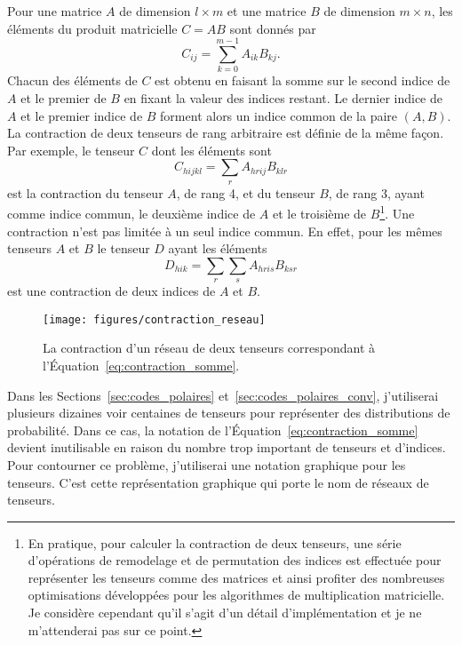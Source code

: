 Pour une matrice $A$ de dimension $l \times m$ et une matrice $B$ de dimension $m \times n$,
les éléments du produit matricielle $C = AB$ sont donnés par
\begin{equation}
  C_{ij} = \sum_{k=0}^{m - 1} A_{ik} B_{kj}.
\end{equation}
Chacun des éléments de $C$ est obtenu en faisant 
la somme sur le second indice de $A$ et le premier de $B$ 
en fixant la valeur des indices restant.
Le dernier indice de $A$ et le premier indice de $B$ forment 
alors un indice common de la paire $(A, B)$.
La contraction de deux tenseurs de rang arbitraire est définie 
de la même façon.
Par exemple, 
le tenseur $C$ dont les éléments sont
\begin{equation}
  C_{hijkl} = \sum_{r} A_{hrij} B_{klr}
\end{equation}
est la contraction du tenseur $A$, de rang 4,
et du tenseur $B$, de rang 3, 
ayant comme indice commun,
le deuxième indice de $A$ et le troisième de $B$\footnote{
En pratique, pour calculer la contraction de deux tenseurs, 
une série d'opérations de remodelage et de permutation des indices 
est effectuée pour représenter les tenseurs comme des matrices et 
ainsi profiter des nombreuses optimisations développées pour les algorithmes
de multiplication matricielle.
Je considère cependant qu'il s'agit d'un détail d'implémentation 
et je ne m'attenderai pas sur ce point.}.
Une contraction n'est pas limitée à un seul indice commun.
En effet,
pour les mêmes tenseurs $A$ et $B$ le tenseur $D$ ayant les éléments
\begin{equation}
  D_{hik} = \sum_{r} \sum_{s} A_{hris} B_{ksr}
  \label{eq:contraction_somme}
\end{equation}
est une contraction de deux indices de $A$ et $B$.

\begin{figure}[t]
  \begin{center}
    \texttt{[image: figures/contraction\_reseau]}
  \end{center}
  \caption{
    La contraction d'un réseau de deux tenseurs 
    correspondant à l'Équation~\eqref{eq:contraction_somme}.
  }
  \label{fig:contraction_reseau}
\end{figure}

Dans les Sections~\ref{sec:codes_polaires} et~\ref{sec:codes_polaires_conv},
j'utiliserai plusieurs dizaines voir centaines de tenseurs pour 
représenter des distributions de probabilité.
Dans ce cas, 
la notation de l'Équation~\eqref{eq:contraction_somme} devient inutilisable 
en raison du nombre trop important de tenseurs et d'indices.
Pour contourner ce problème,
j'utiliserai une notation graphique pour les tenseurs.
C'est cette représentation graphique qui porte le nom de réseaux de tenseurs.

